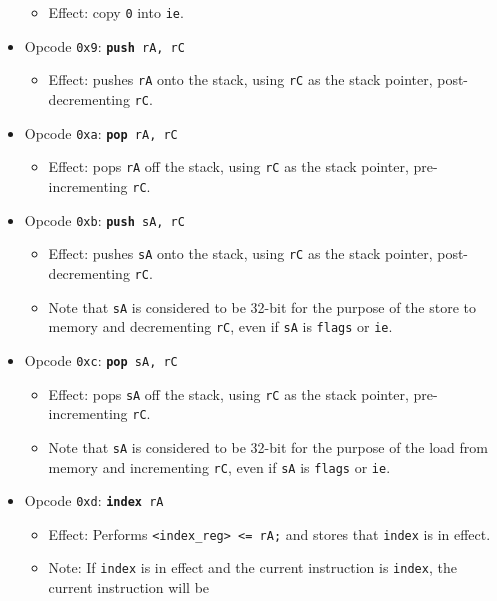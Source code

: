 \documentclass{article}
\begin{document}
\begin{itemize}
\begin{itemize}
			\item Effect:  copy \texttt{0} into \texttt{ie}.
		\end{itemize}
		\item Opcode \texttt{0x9}:
			\texttt{\textbf{push} rA, rC}
		\begin{itemize}
			\item Effect:  pushes \texttt{rA} onto the stack, using
			\texttt{rC} as the stack pointer, post-decrementing
			\texttt{rC}.
		\end{itemize}
		\item Opcode \texttt{0xa}:
			\texttt{\textbf{pop} rA, rC}
		\begin{itemize}
			\item Effect:  pops \texttt{rA} off the stack, using
			\texttt{rC} as the stack pointer, pre-incrementing \texttt{rC}.
		\end{itemize}
		\item Opcode \texttt{0xb}:
			\texttt{\textbf{push} sA, rC}
		\begin{itemize}
			\item Effect:  pushes \texttt{sA} onto the stack, using
			\texttt{rC} as the stack pointer, post-decrementing
			\texttt{rC}.
			\item Note that \texttt{sA} is considered to be 32-bit for the
			purpose of the store to memory and decrementing \texttt{rC},
			even if \texttt{sA} is \texttt{flags} or \texttt{ie}.
		\end{itemize}
		\item Opcode \texttt{0xc}:
			\texttt{\textbf{pop} sA, rC}
		\begin{itemize}
			\item Effect:  pops \texttt{sA} off the stack, using
			\texttt{rC} as the stack pointer, pre-incrementing \texttt{rC}.
			\item Note that \texttt{sA} is considered to be 32-bit for the
			purpose of the load from memory and incrementing \texttt{rC},
			even if \texttt{sA} is \texttt{flags} or \texttt{ie}.
		\end{itemize}
		\item Opcode \texttt{0xd}:
			\texttt{\textbf{index} rA}
		\begin{itemize}
			\item Effect:  Performs \texttt{<index\_reg> <= rA;} and stores
			that \texttt{index} is in effect.
			\item Note:  If \texttt{index} is in effect and the current
			instruction is \texttt{index}, the current instruction will be

\end{itemize}
\end{itemize}
\end{document}
